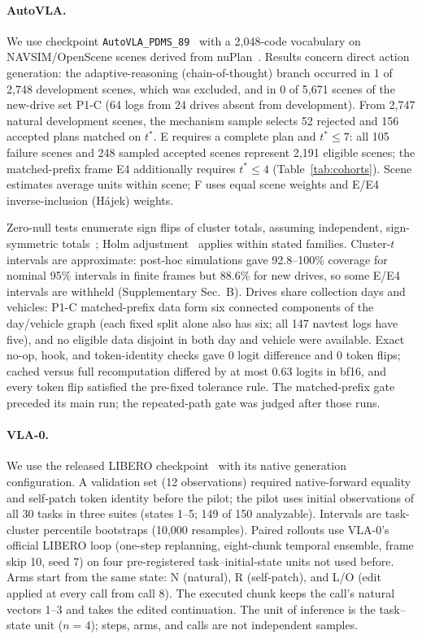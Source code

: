 \paragraph{AutoVLA.}
We use checkpoint \texttt{AutoVLA\_PDMS\_89}~\cite{zhou2025autovla} with a 2,048-code vocabulary on NAVSIM/OpenScene scenes derived from nuPlan~\cite{dauner2024navsim,openscene2023,caesar2021nuplan}. Results concern direct action generation: the adaptive-reasoning (chain-of-thought) branch occurred in 1 of 2,748 development scenes, which was excluded, and in 0 of 5,671 scenes of the new-drive set P1-C (64 logs from 24 drives absent from development). From 2,747 natural development scenes, the mechanism sample selects 52 rejected and 156 accepted plans matched on $t^*$. E requires a complete plan and $t^*\leq7$: all 105 failure scenes and 248 sampled accepted scenes represent 2,191 eligible scenes; the matched-prefix frame E4 additionally requires $t^*\leq4$ (Table~\ref{tab:cohorts}). Scene estimates average units within scene; F uses equal scene weights and E/E4 inverse-inclusion (H\'ajek) weights.

Zero-null tests enumerate sign flips of cluster totals, assuming independent, sign-symmetric totals~\cite{winkler2015multilevel}; Holm adjustment~\cite{holm1979simple} applies within stated families. Cluster-$t$ intervals are approximate: post-hoc simulations gave 92.8--100\% coverage for nominal 95\% intervals in finite frames but 88.6\% for new drives, so some E/E4 intervals are withheld (Supplementary Sec.~B). Drives share collection days and vehicles: P1-C matched-prefix data form six connected components of the day/vehicle graph (each fixed split alone also has six; all 147 navtest logs have five), and no eligible data disjoint in both day and vehicle were available. Exact no-op, hook, and token-identity checks gave 0 logit difference and 0 token flips; cached versus full recomputation differed by at most 0.63 logits in bf16, and every token flip satisfied the pre-fixed tolerance rule. The matched-prefix gate preceded its main run; the repeated-path gate was judged after those runs.

\paragraph{VLA-0.}
We use the released LIBERO checkpoint~\cite{goyal2025vla0,liu2023libero} with its native generation configuration. A validation set (12 observations) required native-forward equality and self-patch token identity before the pilot; the pilot uses initial observations of all 30 tasks in three suites (states 1--5; 149 of 150 analyzable). Intervals are task-cluster percentile bootstraps (10,000 resamples). Paired rollouts use VLA-0's official LIBERO loop (one-step replanning, eight-chunk temporal ensemble, frame skip 10, seed 7) on four pre-registered task--initial-state units not used before. Arms start from the same state: N (natural), R (self-patch), and L/O (edit applied at every call from call 8). The executed chunk keeps the call's natural vectors 1--3 and takes the edited continuation. The unit of inference is the task--state unit ($n=4$); steps, arms, and calls are not independent samples.

